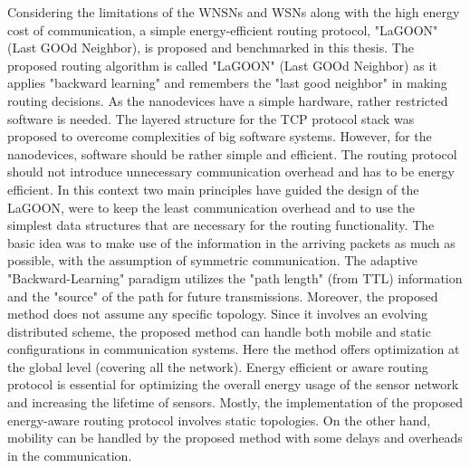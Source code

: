 \documentclass[12pt, oneandhalf, chaparabic, sees, ms]{metu}
\begin{document}
Considering the limitations of the WNSNs and WSNs along with the high energy cost of communication, a simple energy-efficient 
routing protocol, "LaGOON" (Last GOOd Neighbor), is proposed and benchmarked in this thesis.
The proposed routing algorithm is called "LaGOON" (Last GOOd Neighbor) as it applies "backward learning" and remembers the "last good neighbor" in making routing decisions. 
As the nanodevices have a simple hardware, rather restricted software is needed. The layered structure for the TCP protocol stack 
was proposed to overcome complexities of big software systems. However, for the nanodevices, software should be rather simple and efficient.
The routing protocol should not introduce unnecessary communication overhead and has to be energy efficient. 
In this context two main principles have guided the design of the LaGOON, were to keep the least 
communication overhead
and to use the simplest data structures that are necessary for the routing functionality. 
The basic idea was to make use of the information in the arriving packets as much as possible, 
with the assumption of symmetric communication. 
The adaptive "Backward-Learning" paradigm utilizes the "path length" (from TTL) information and the "source" of the path for future transmissions.
Moreover, the proposed method does not assume any specific topology. 
Since it involves an evolving distributed scheme, the proposed method can handle both mobile and static configurations in communication systems.
Here the method offers optimization at the global level (covering all the network).
Energy efficient or aware routing protocol is essential for optimizing the overall energy usage of the sensor network and increasing the lifetime of sensors.
Mostly, the implementation of the proposed energy-aware routing protocol involves static topologies. 
On the other hand, mobility can be handled by the proposed method 
with some delays and overheads in the communication.
\end{document}
